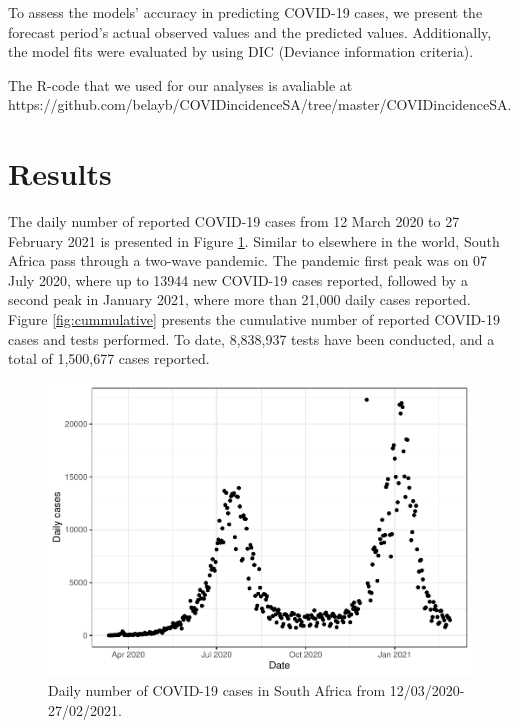 \documentclass[10pt,letterpaper]{article}
\begin{document}
To assess the models' accuracy in predicting COVID-19 cases, we present
the forecast period's actual observed values and the predicted values.
Additionally, the model fits were evaluated by using DIC (Deviance
information criteria).

The R-code that we used for our analyses is avaliable at
https://github.com/belayb/COVIDincidenceSA/tree/master/COVIDincidenceSA.

\hypertarget{results}{%
\section{Results}\label{results}}

The daily number of reported COVID-19 cases from 12
March 2020 to 27 February 2021 is presented in Figure \ref{fig:daily-cases}. Similar to elsewhere in the world, South
Africa pass through a two-wave pandemic. The pandemic first peak was
on 07 July 2020, where up to 13944 new COVID-19 cases reported, followed
by a second peak in January 2021, where more than 21,000 daily cases
reported. Figure \ref{fig:cummulative} presents the cumulative number of reported
COVID-19 cases and tests performed. To date, 8,838,937 tests have been
conducted, and a total of 1,500,677 cases reported.

\begin{figure}[H]
\includegraphics[width=0.99\linewidth]{COVIDincidenceSA_files/figure-latex/daily-cases-1} \caption{Daily number of COVID-19 cases in South Africa from 12/03/2020-27/02/2021.}\label{fig:daily-cases}
\end{figure}
\end{document}
